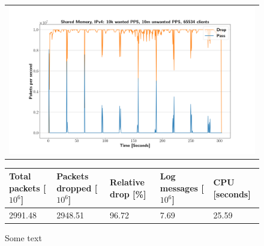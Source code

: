 \begin{figure}[!h]
	\label{fig:simplefail2ban:shm:ip4:10m}
	\centering
	\scriptsize
	\begin{tabular}{c}
    	\centerline{\includegraphics[width=1.2\textwidth]{images/simplefail2ban_shm_ipv4_v10k_iv10m_c65534.png}}
	\end{tabular}
	\begin{tabular}{lllll}
		\toprule
		\textbf{Total packets [$10^6$]} & \textbf{Packets dropped [$10^6$]} & \textbf{Relative drop [\%]} & \textbf{Log messages [$10^6$]} & \textbf{CPU [seconds]} \\ \midrule 
		2991.48 & 2948.51 & 96.72 & 7.69 & 25.59 \\
		\bottomrule
	\end{tabular}
	\caption[Simplefail2ban, Shared Memory, IPv4, 10m \ac{PPS}]{Some text}
\end{figure}


